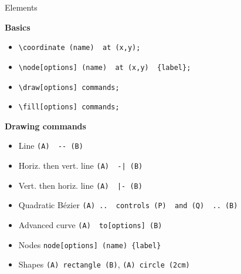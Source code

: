 \documentclass[xetex, onlymath, handout]{beamer}
\begin{document}
\begin{frame}[fragile]{Elements}

  {\bfseries Basics}
  \begin{itemize}
    \item \lstinline!\coordinate (name)  at (x,y);!
    \item \lstinline!\node[options] (name)  at (x,y)  {label};!
    \item \lstinline!\draw[options] commands;!
    \item \lstinline!\fill[options] commands;!
  \end{itemize}

  {\bfseries Drawing commands}
  \begin{itemize}
    \item Line \lstinline!(A)  -- (B)!
    \item Horiz. then vert. line \lstinline!(A)  -| (B)!
    \item Vert. then horiz. line \lstinline!(A)  |- (B)!
    \item Quadratic B\'ezier \lstinline!(A) ..  controls (P)  and (Q)  .. (B)!
    \item Advanced curve \lstinline!(A)  to[options] (B)!
    \item Nodes \lstinline!node[options] (name) {label}!
    \item Shapes \lstinline!(A) rectangle (B)!, \lstinline!(A) circle (2cm)!
  \end{itemize}
\end{frame}
\end{document}
